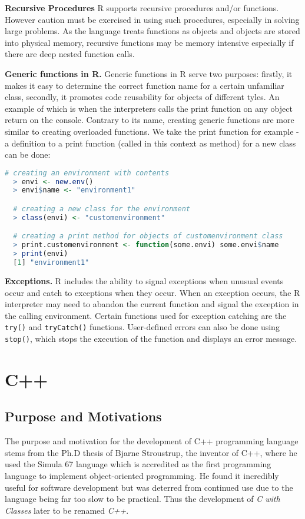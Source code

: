 \documentclass[12pt]{article}
\begin{document}
\textbf{Recursive Procedures} R supports recursive procedures and/or functions. However caution must be exercised in using such procedures, especially in solving large problems. As the language treats functions as objects and objects are stored into physical memory, recursive functions may be memory intensive especially if there are deep nested function calls.

\textbf{Generic functions in R.} Generic functions in R serve two purposes: firstly, it makes it easy to determine the correct function name for a certain unfamiliar class, secondly, it promotes code reusability for objects of different tyles. An example of which is when the interpreters calls the print function on any object return on the console. Contrary to its name, creating generic functions are more similar to creating overloaded functions. We take the print function for example - a definition to a print function (called in this context as method) for a new class can be done:

\begin{lstlisting}[language=R, frame=none]
  # creating an environment with contents
  > envi <- new.env()
  > envi$name <- "environment1"

  # creating a new class for the environment
  > class(envi) <- "customenvironment"

  # creating a print method for objects of customenvironment class
  > print.customenvironment <- function(some.envi) some.envi$name
  > print(envi)
  [1] "environment1"
\end{lstlisting}

\textbf{Exceptions.} R includes the ability to signal exceptions when unusual events occur and catch to exceptions when they occur. When an exception occurs, the R interpreter may need to abandon the current function and signal the exception in the calling environment. Certain functions used for exception catching are the \texttt{try()} and \texttt{tryCatch()} functions. User-defined errors can also be done using \texttt{stop()}, which stops the execution of the function and displays an error message.

\section{C++}
\subsection{Purpose and Motivations}
The purpose and motivation for the development of C++ programming language stems from the Ph.D thesis of Bjarne Stroustrup, the
inventor of C++, where he used the Simula 67 language which is accredited as the first programming language to implement 
object-oriented programming. He found it incredibly useful for software development but was deterred from continued use
due to the language being far too slow to be practical. Thus the development of \textit{C with Classes} later to be renamed \textit{C++}.
\end{document}
